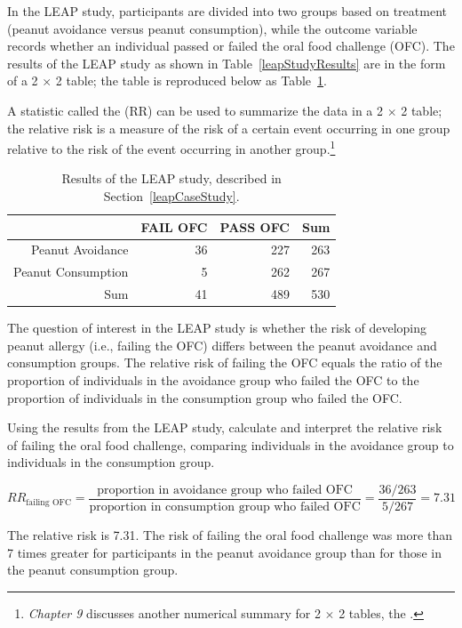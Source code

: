 In the LEAP study, participants are divided into two groups based on treatment (peanut avoidance versus peanut consumption), while the outcome variable records whether an individual passed or failed the oral food challenge (OFC). The results of the LEAP study as shown in Table~\ref{leapStudyResults} are in the form of a 2 $\times$ 2 table; the table is reproduced below as Table~\ref{leapStudyResultsRR}.

A statistic called the  (RR) can be used to summarize the data in a 2 $\times$ 2 table; the relative risk is a measure of the risk of a certain event occurring in one group relative to the risk of the event occurring in another group.\footnote{\textit{Chapter 9} discusses another numerical summary for 2 $\times$ 2 tables, the .}  


\begin{table}[ht]
	\centering
	\begin{tabular}{rrrr}
		\hline
		& FAIL OFC & PASS OFC & Sum \\ 
		\hline
		Peanut Avoidance & 36 & 227 & 263 \\ 
		Peanut Consumption & 5 & 262 & 267 \\ 
		Sum & 41 & 489 & 530 \\ 
		\hline
	\end{tabular}
	\caption{Results of the LEAP study, described in Section~\ref{leapCaseStudy}.}
	\label{leapStudyResultsRR}
\end{table}

The question of interest in the LEAP study is whether the risk of developing peanut allergy (i.e., failing the OFC) differs between the peanut avoidance and consumption groups. The relative risk of failing the OFC equals the ratio of the proportion of individuals in the avoidance group who failed the OFC to the proportion of individuals in the consumption group who failed the OFC.

\begin{example}{Using the results from the LEAP study, calculate and interpret the relative risk of failing the oral food challenge, comparing individuals in the avoidance group to individuals in the consumption group.}
	
\[RR_{\textrm{failing OFC}} = \dfrac{\textrm{proportion in avoidance group who failed OFC}}{\textrm{proportion in consumption group who failed OFC}} = \dfrac{36/263}{5/267} = 7.31 \]

The relative risk is 7.31. The risk of failing the oral food challenge was more than 7 times greater for participants in the peanut avoidance group than for those in the peanut consumption group.
	
\end{example}

